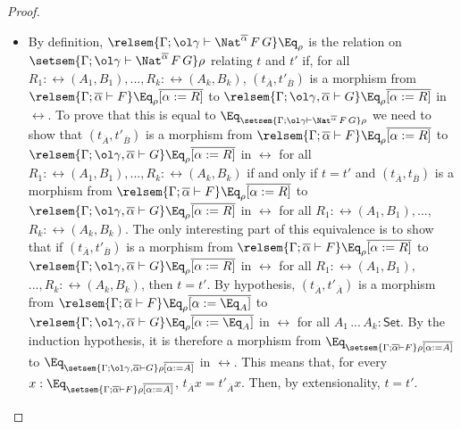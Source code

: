\documentclass[acmsmall,review,anonymous]{acmart}
\theoremstyle{definition}
\newcommand{\set}{\mathsf{Set}}
\begin{document}
\begin{proof}
\begin{itemize}
\item
By definition, $\relsem{\Gamma; \ol\gamma \vdash
  \Nat^{\overline\alpha} \,F\,G} \Eq_{\rho}$ is the relation on
  $\setsem{\Gamma; \ol\gamma \vdash \Nat^{\overline\alpha} \,F\,G}
  \rho$ relating $t$ and $t'$ if, for all ${R_1 :
    \rel(A_1,B_1)},...,{R_k : \rel(A_k,B_k)}$, $(t_{\overline{A}},
  t'_{\overline{B}})$ is a morphism from $\relsem{\Gamma;
    \overline\alpha \vdash F} \Eq_{\rho}\overline{[\alpha := R]}$ to
  $\relsem{\Gamma ; \ol\gamma, \overline\alpha \vdash G}
  \Eq_{\rho}\overline{[\alpha := R]}$ in $\rel$.  To prove that this
  is equal to $\Eq_{\setsem{\Gamma; \ol\gamma \vdash
      \Nat^{\overline\alpha} \,F\,G} \rho}$ we need to show that
  $(t_{\overline{A}}, t'_{\overline{B}})$ is a morphism from
  $\relsem{\Gamma; \overline\alpha \vdash F}
  \Eq_{\rho}\overline{[\alpha := R]}$ to $\relsem{\Gamma ;
  \ol\gamma, \overline\alpha \vdash G} \Eq_{\rho}\overline{[\alpha := R]}$ in
  $\rel$ for all ${R_1 : \rel(A_1,B_1)},...,{R_k : \rel(A_k,B_k)}$ if
  and only if $t = t'$ and $(t_{\overline{A}}, t_{\overline{B}})$ is a
  morphism from $\relsem{\Gamma; \overline\alpha \vdash F}
  \Eq_{\rho}\overline{[\alpha := R]}$ to $\relsem{\Gamma ; \ol\gamma, \overline
    \alpha \vdash G} \Eq_{\rho}\overline{[\alpha := R]}$ in $\rel$ for
  all ${R_1 : \rel(A_1,B_1)}, ...,$ ${R_k : \rel(A_k,B_k)}$. The only
  interesting part of this equivalence is to show that if
  $(t_{\overline{A}}, t'_{\overline{B}})$ is a morphism from
  $\relsem{\Gamma; \overline\alpha \vdash F}
  \Eq_{\rho}\overline{[\alpha := R]}$ to $\relsem{\Gamma ; \ol\gamma,
    \overline\alpha \vdash G} \Eq_{\rho}\overline{[\alpha := R]}$ in
  $\rel$ for all ${R_1 : \rel(A_1,B_1),}$ $...,{R_k : \rel(A_k,B_k)}$,
  then $t = t'$.  By hypothesis, $(t_{\overline{A}},
  t'_{\overline{A}})$ is a morphism from $\relsem{\Gamma;
    \overline\alpha \vdash F} \Eq_{\rho}\overline{[\alpha :=
      \Eq_{A}]}$ to $\relsem{\Gamma ; \ol\gamma, \overline\alpha \vdash G}
  \Eq_{\rho}\overline{[\alpha := \Eq_{A}]}$ in $\rel$ for all
  $A_1\,...\,A_k : \set$. By the induction hypothesis, it is therefore
  a morphism from $\Eq_{\setsem{\Gamma; \overline\alpha \vdash F}
    \rho\overline{[\alpha := A]}}$ to $\Eq_{\setsem{\Gamma ; \ol\gamma,
      \overline\alpha \vdash G} \rho\overline{[\alpha := A]}}$ in
  $\rel$. This means that, for every $x : \Eq_{\setsem{\Gamma;
      \overline\alpha \vdash F} \rho\overline{[\alpha := A]}}$,
  $t_{\overline{A}}x = t'_{\overline{A}}x$.  Then, by extensionality,
  $t = t'$.


\end{itemize}
\end{proof}
\end{document}
